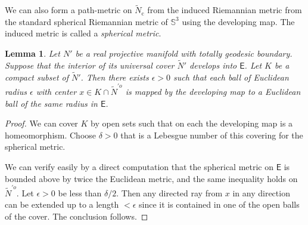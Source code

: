 \documentclass{amsart}
\numberwithin{equation}{section}
\newcommand\SI{{\mathbb{S}}}
\newcommand\eps{\epsilon}
\newcommand\Lspace{\mathsf E}
\newtheorem{lemma}[theorem]{Lemma}
\theoremstyle{definition}
\theoremstyle{remark}
\newcommand{\romec}{\mathrm{c}}
\newcommand{\romecr}{{\mathrm{c}, \mathrm{r}}}
\begin{document}
We can also form a path-metric on $\tilde N_{\romec} $ from the induced Riemannian 
metric from the standard spherical Riemannian metric of $\SI^3$ 
using the developing map. 
The induced metric is called a {\em spherical metric}. 

\begin{lemma}\label{lem:compact} 
Let $N'$ be a real projective manifold  with totally geodesic boundary. 
Suppose that 
the interior of its universal cover $\tilde N'$ develops into $\Lspace$. 
Let $K$ be a compact subset of $\tilde N'$. 
Then there exists $\eps > 0$ such that each
ball of Euclidean radius $\eps$ with 
center $x \in K \cap \tilde N^{\prime o}$ is mapped by 
the developing map 
to a Euclidean ball of the same radius in $\Lspace$.  
\end{lemma} 
\begin{proof} 
We can cover $K$ by open sets such that on each
the developing map is a homeomorphism.  
Choose $\delta >0$ that is a Lebesgue number of 
this covering for the spherical metric. 

We can verify easily by a direct computation that 
the spherical metric on $\Lspace$ is bounded above by 
twice the Euclidean metric, 
and the same inequality holds on $\tilde N^{\prime o}$. 
Let $\eps > 0$ be less than $\delta/2$. 
Then any directed ray from $x$ in any direction can be extended up to a 
length $<\eps$ since it is contained in one of the open balls of the cover.
The conclusion follows. 
\end{proof} 


\end{document}
